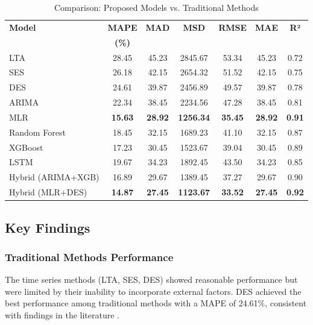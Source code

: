 \documentclass[conference]{IEEEtran}
\begin{document}
\begin{table}[htbp]
\caption{Comparison: Proposed Models vs. Traditional Methods}
\begin{center}
\small
\begin{tabular}{lcccccc}
\toprule
\textbf{Model} & \textbf{MAPE} & \textbf{MAD} & \textbf{MSD} & \textbf{RMSE} & \textbf{MAE} & \textbf{R²} \\
 & \textbf{(\%)} & & & & & \\
\midrule
LTA & 28.45 & 45.23 & 2845.67 & 53.34 & 45.23 & 0.72 \\
SES & 26.18 & 42.15 & 2654.32 & 51.52 & 42.15 & 0.75 \\
DES & 24.61 & 39.87 & 2456.89 & 49.57 & 39.87 & 0.78 \\
ARIMA & 22.34 & 38.45 & 2234.56 & 47.28 & 38.45 & 0.81 \\
\midrule
MLR & \textbf{15.63} & \textbf{28.92} & \textbf{1256.34} & \textbf{35.45} & \textbf{28.92} & \textbf{0.91} \\
Random Forest & 18.45 & 32.15 & 1689.23 & 41.10 & 32.15 & 0.87 \\
XGBoost & 17.23 & 30.45 & 1523.67 & 39.04 & 30.45 & 0.89 \\
LSTM & 19.67 & 34.23 & 1892.45 & 43.50 & 34.23 & 0.85 \\
\midrule
Hybrid (ARIMA+XGB) & 16.89 & 29.67 & 1389.45 & 37.27 & 29.67 & 0.90 \\
Hybrid (MLR+DES) & \textbf{14.87} & \textbf{27.45} & \textbf{1123.67} & \textbf{33.52} & \textbf{27.45} & \textbf{0.92} \\
\bottomrule
\end{tabular}
\normalsize
\label{tab:comparison}
\end{center}
\end{table}

\subsection{Key Findings}

\subsubsection{Traditional Methods Performance}
The time series methods (LTA, SES, DES) showed reasonable performance but were limited by their inability to incorporate external factors. DES achieved the best performance among traditional methods with a MAPE of 24.61\%, consistent with findings in the literature \cite{b1}.
\end{document}
